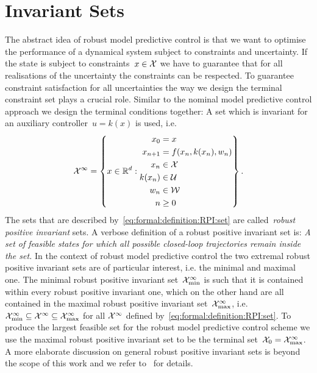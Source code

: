 \section{Invariant Sets}\label{ch:concepts:sec:RMPC:invariant:sets}
\resetforsection
%
The abstract idea of robust model predictive control is that we want to optimise the performance of a dynamical system subject to constraints and uncertainty.
%
If the state is subject to constraints~$x\in\mathcal X$ we have to guarantee that for all realisations of the uncertainty the constraints can be respected.
%
To guarantee constraint satisfaction for all uncertainties the way we design the terminal constraint set plays a crucial role.
%
Similar to the nominal model predictive control approach we design the terminal conditions together: 
%
A set which is invariant for an auxiliary controller~$u=k(x)$ is used, i.e.
%
\begin{equation}\label{eq:formal:definition:RPI:set}
	\mathcal X^\infty = \left\{x\in\mathbb R^d:\begin{aligned}
	x_0&=x\\
	x_{n+1}&=f(x_n,k(x_n),w_n)\\
	x_n&\in\mathcal X\\
	k(x_n)&\in\mathcal U\\
	w_n&\in\mathcal W\\
	n&\geq0
	\end{aligned}\right\}.
\end{equation}
%
The sets that are described by~\eqref{eq:formal:definition:RPI:set} are called~\emph{robust positive invariant} sets.
%
A verbose definition of a robust positive invariant set is: 
%
\emph{A set of feasible states for which all possible closed-loop trajectories remain inside the set.}
%
In the context of robust model predictive control the two extremal robust positive invariant sets are of particular interest, i.e. the minimal and maximal one.
%
The minimal robust positive invariant set~$\mathcal X^\infty_{\min}$ is such that it is contained within every robust positive invariant one, which on the other hand are all contained in the maximal robust positive invariant set~$\mathcal X_{\max}^\infty$, i.e. $\mathcal X_{\min}^\infty\subseteq\mathcal X^\infty\subseteq\mathcal X^\infty_{\max}$ for all $\mathcal X^\infty$ defined by~\eqref{eq:formal:definition:RPI:set}.
%
To produce the largest feasible set for the robust model predictive control scheme we use the maximal robust positive invariant set to be the terminal set~$\mathcal X_0=\mathcal X_{\max}^\infty$.
%
A more elaborate discussion on general robust positive invariant sets is beyond the scope of this work and we refer to~\cite{blanchini:2007} for details.
%
%
%
%
